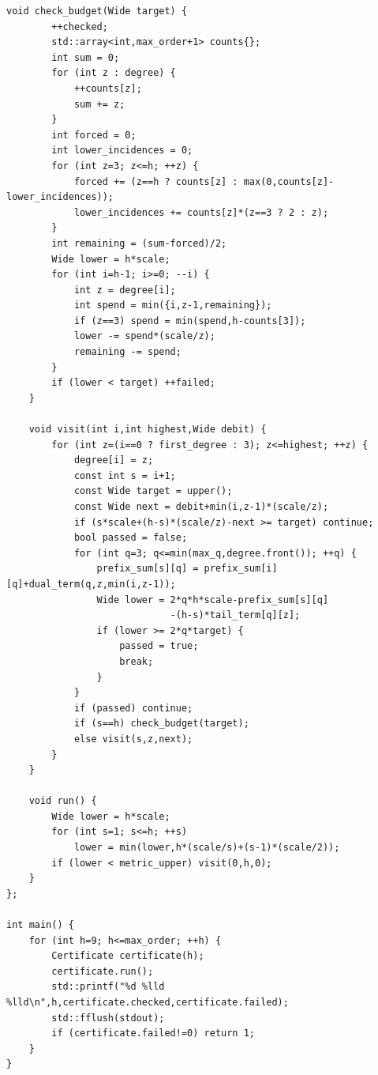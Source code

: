 \documentclass[11pt,a4paper]{article}
\begin{document}
\begin{Verbatim}[fontsize=\scriptsize]
    void check_budget(Wide target) {
        ++checked;
        std::array<int,max_order+1> counts{};
        int sum = 0;
        for (int z : degree) {
            ++counts[z];
            sum += z;
        }
        int forced = 0;
        int lower_incidences = 0;
        for (int z=3; z<=h; ++z) {
            forced += (z==h ? counts[z] : max(0,counts[z]-lower_incidences));
            lower_incidences += counts[z]*(z==3 ? 2 : z);
        }
        int remaining = (sum-forced)/2;
        Wide lower = h*scale;
        for (int i=h-1; i>=0; --i) {
            int z = degree[i];
            int spend = min({i,z-1,remaining});
            if (z==3) spend = min(spend,h-counts[3]);
            lower -= spend*(scale/z);
            remaining -= spend;
        }
        if (lower < target) ++failed;
    }

    void visit(int i,int highest,Wide debit) {
        for (int z=(i==0 ? first_degree : 3); z<=highest; ++z) {
            degree[i] = z;
            const int s = i+1;
            const Wide target = upper();
            const Wide next = debit+min(i,z-1)*(scale/z);
            if (s*scale+(h-s)*(scale/z)-next >= target) continue;
            bool passed = false;
            for (int q=3; q<=min(max_q,degree.front()); ++q) {
                prefix_sum[s][q] = prefix_sum[i][q]+dual_term(q,z,min(i,z-1));
                Wide lower = 2*q*h*scale-prefix_sum[s][q]
                             -(h-s)*tail_term[q][z];
                if (lower >= 2*q*target) {
                    passed = true;
                    break;
                }
            }
            if (passed) continue;
            if (s==h) check_budget(target);
            else visit(s,z,next);
        }
    }

    void run() {
        Wide lower = h*scale;
        for (int s=1; s<=h; ++s)
            lower = min(lower,h*(scale/s)+(s-1)*(scale/2));
        if (lower < metric_upper) visit(0,h,0);
    }
};

int main() {
    for (int h=9; h<=max_order; ++h) {
        Certificate certificate(h);
        certificate.run();
        std::printf("%d %lld %lld\n",h,certificate.checked,certificate.failed);
        std::fflush(stdout);
        if (certificate.failed!=0) return 1;
    }
}
\end{Verbatim}
\end{document}
